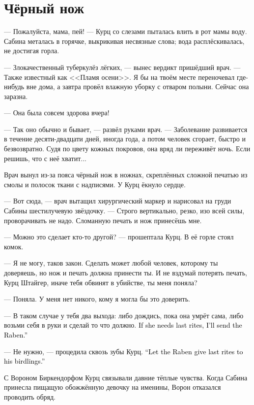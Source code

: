 \documentclass[a4paper,10pt,fleqn]{book}\usepackage{polyglossia}\setdefaultlanguage{english}\setotherlanguage{russian}\defaultfontfeatures{Ligatures=TeX,Mapping=tex-text}\usepackage{xcolor}\definecolor{lightgray}{HTML}{bbbbbb}\color{lightgray}\newcommand{\ml}[3]{\textcolor{black}{#3}}
\begin{document}
\section{Чёрный нож}

--- Пожалуйста, мама, пей! --- Курц со слезами пыталась влить в рот мамы воду.
Сабина металась в горячке, выкрикивая несвязные слова;
вода расплёскивалась, не достигая горла.

--- Злокачественный туберкулёз лёгких, --- вынес вердикт пришёдший врач.
--- Также известный как <<Пламя осени>>.
Я бы на твоём месте переночевал где-нибудь вне дома, а завтра провёл влажную уборку с отваром полыни.
Сейчас она заразна.

--- Она была совсем здорова вчера!

--- Так оно обычно и бывает, --- развёл руками врач.
--- Заболевание развивается в течение десяти-двадцати дней, иногда года, а потом человек сгорает, быстро и безвозвратно.
Судя по цвету кожных покровов, она вряд ли переживёт ночь.
Если решишь, что с неё хватит...

Врач вынул из-за пояса чёрный нож в ножнах, скреплённых сложной печатью из смолы и полосок ткани с надписями.
У Курц ёкнуло сердце.

--- Вот сюда, --- врач вытащил хирургический маркер и нарисовал на груди Сабины шестилучевую звёздочку.
--- Строго вертикально, резко, изо всей силы, проворачивать не надо.
Сломанную печать и нож принесёшь мне.

--- Можно это сделает кто-то другой? --- прошептала Курц.
В её горле стоял комок.

--- Я не могу, таков закон.
Сделать может любой человек, которому ты доверяешь, но нож и печать должна принести ты.
И не вздумай потерять печать, Курц Штайгер, иначе тебя обвинят в убийстве, ты меня поняла?

--- Поняла.
У меня нет никого, кому я могла бы это доверить.

--- В таком случае у тебя два выхода: либо дождись, пока она умрёт сама, либо возьми себя в руки и сделай то что должно.
\ml{$0$}
{Если нужно отпеть --- я могу прислать Ворона.}
{If she needs last rites, I'll send the Raben.''}

--- Не нужно, --- процедила сквозь зубы Курц.
\ml{$0$}
{--- Пусть Ворон своих птенцов отпевает.}
{``Let the Raben give last rites to his birdlings.''}

С Вороном Биркендорфом Курц связывали давние тёплые чувства.
Когда Сабина принесла пищащую обожжённую девочку на именины, Ворон отказался проводить обряд.
\end{document}
